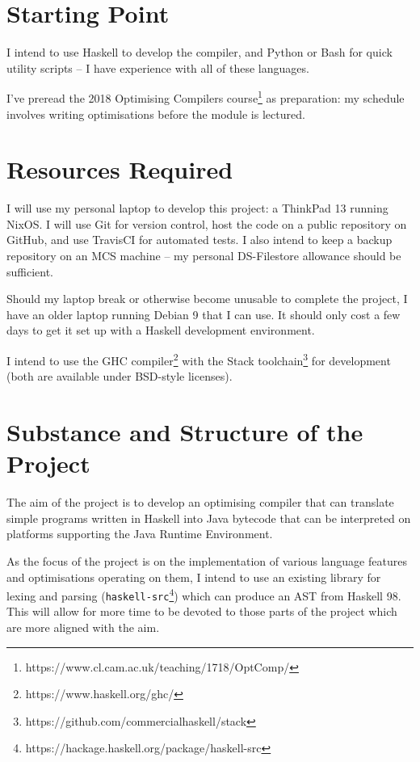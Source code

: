 \documentclass[12pt]{article}
\newcommand\monospace[1]{\texttt{#1}}
\begin{document}
\section*{Starting Point}

I intend to use Haskell to develop the compiler, and Python or Bash for quick utility scripts -- I have experience with
all of these languages.

I've preread the 2018 Optimising Compilers course\footnote{https://www.cl.cam.ac.uk/teaching/1718/OptComp/} as
preparation: my schedule involves writing optimisations before the module is lectured.


\section*{Resources Required}

I will use my personal laptop to develop this project: a ThinkPad 13 running NixOS. I will use Git for version control,
host the code on a public repository on GitHub, and use TravisCI for automated tests. I also intend to keep a backup
repository on an MCS machine -- my personal DS-Filestore allowance should be sufficient.

Should my laptop break or otherwise become unusable to complete the project, I have an older laptop running Debian 9
that I can use. It should only cost a few days to get it set up with a Haskell development environment.

I intend to use the GHC compiler\footnote{https://www.haskell.org/ghc/} with the Stack
toolchain\footnote{https://github.com/commercialhaskell/stack} for development (both are available under BSD-style
licenses).


\section*{Substance and Structure of the Project}

The aim of the project is to develop an optimising compiler that can translate simple programs written in Haskell into
Java bytecode that can be interpreted on platforms supporting the Java Runtime Environment.

As the focus of the project is on the implementation of various language features and optimisations operating on them, I
intend to use an existing library for lexing and parsing
(\monospace{haskell-src}\footnote{https://hackage.haskell.org/package/haskell-src}) which can produce an AST from
Haskell 98. This will allow for more time to be devoted to those parts of the project which are more aligned with the
aim.
\end{document}
